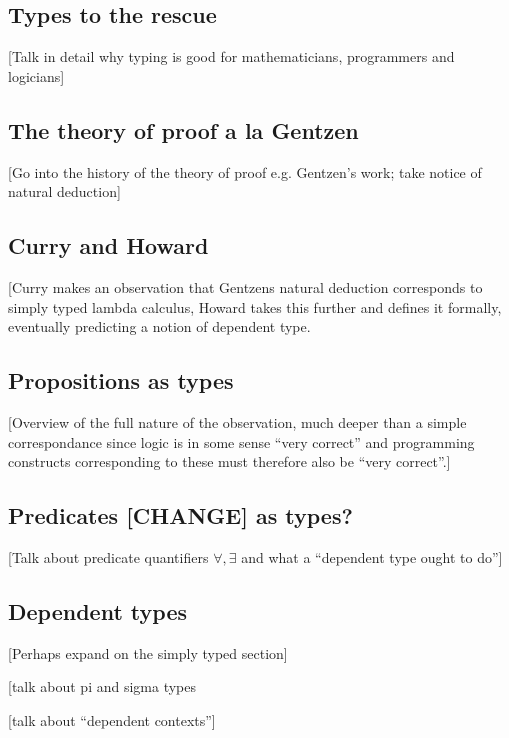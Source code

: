 \subsection{Types to the rescue}

[Talk in detail why typing is good for mathematicians, programmers and logicians]

\subsection{The theory of proof a la Gentzen}

[Go into the history of the theory of proof e.g. Gentzen's work; take notice of natural deduction]

\subsection{Curry and Howard}

[Curry makes an observation that Gentzens natural deduction corresponds to simply typed lambda calculus, Howard takes this further and defines it formally, eventually predicting a notion of dependent type.

\subsection{Propositions as types}

[Overview of the full nature of the observation, much deeper than a simple correspondance since logic is in some sense ``very correct'' and programming constructs corresponding to these must therefore also be ``very correct''.]

\subsection{Predicates [CHANGE] as types?}

[Talk about predicate quantifiers $\forall, \exists$ and what a ``dependent type ought to do'']


\subsection{Dependent types}




[Perhaps expand on the simply typed section]

[talk about pi and sigma types

[talk about ``dependent contexts'']


